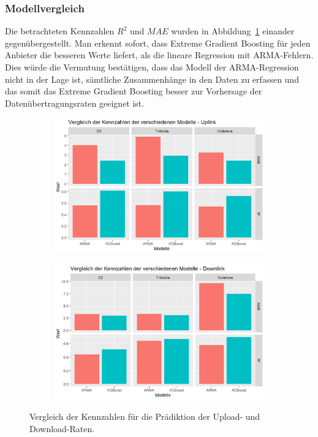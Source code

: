 \subsubsection{Modellvergleich}

Die betrachteten Kennzahlen $R^2$ und $MAE$ wurden in Abbildung~\ref{fig:kennzahlen-datarate} einander gegen\"ubergestellt.
Man erkennt sofort, dass Extreme Gradient Boosting f\"ur jeden Anbieter die besseren Werte liefert, als die lineare Regression mit
ARMA-Fehlern.
Dies w\"urde die Vermutung best\"atigen, dass das Modell der ARMA-Regression nicht in der Lage ist, s\"amtliche Zusammenh\"ange
in den Daten zu erfassen und das somit das Extreme Gradient Boosting besser zur Vorhersage der Daten\"ubertragungsraten geeignet ist.
\begin{figure}
\centering
\begin{subfigure}{0.49\textwidth}
    \centering
    \includegraphics[width=\textwidth]{abbildungen/kennzahlen_vergleich_uplink}
\end{subfigure}
\begin{subfigure}{0.49\textwidth}
    \centering
    \includegraphics[width=\textwidth]{abbildungen/kennzahlen_vergleich_downlink}
\end{subfigure}
\caption{Vergleich der Kennzahlen f\"ur die Pr\"adiktion der Upload- und Download-Raten.}
\label{fig:kennzahlen-datarate}
\end{figure}

